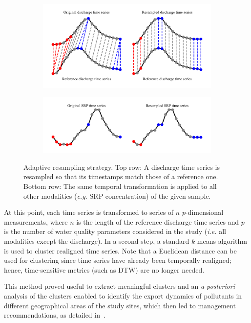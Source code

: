 \begin{figure}[t]
    \begin{subfigure}[b]{\textwidth}
         \centering
         \includegraphics[width=.6\textwidth]{fig/dtw_da}
     \end{subfigure}
      \begin{subfigure}[b]{\textwidth}
           \centering
           \includegraphics[width=.6\textwidth]{fig/dtw_da_b}
       \end{subfigure}
    \caption{Adaptive resampling strategy. Top row: A discharge time series is
    resampled so that its timestamps match those of a reference one. Bottom row:
    The same temporal transformation is applied to all other modalities
    (\emph{e.g.} SRP concentration) of the given sample.}
    \label{fig:dtw_da}
\end{figure}

At this point, each time series is transformed to series of $n$
$p$-dimensional measurements, where $n$ is the length of the
reference discharge time series and $p$ is the number of water quality
parameters considered in the study (\emph{i.e.} all modalities except the
discharge).
In a second step, a standard $k$-means algorithm is used to cluster
realigned time series.
Note that a Euclidean distance can be used for clustering since time series
have already been temporally realigned; hence, time-sensitive metrics (such as
DTW) are no longer needed.

This method proved useful to extract meaningful clusters and an \emph{a posteriori}
analysis of the clusters enabled to identify the export dynamics of pollutants
in different geographical areas of the study sites, which then led to management
recommendations, as detailed in~\cite{dupas:halshs-01228397}.
